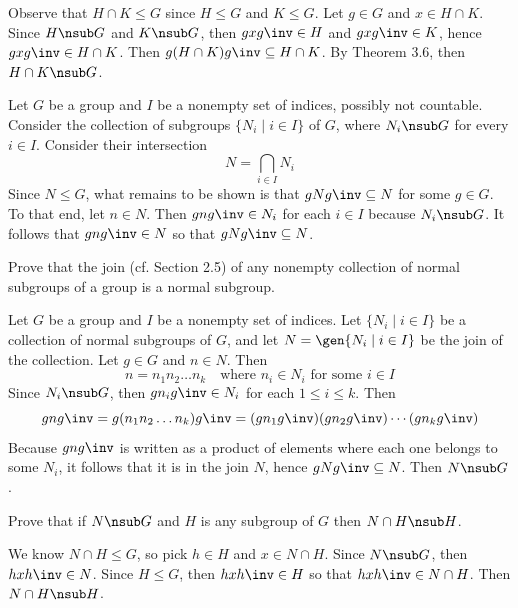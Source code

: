 \begin{solalph}
    \item Observe that $H \cap K \leq G$ since $H \leq G$ and $K \leq G$. Let $g \in G$ and $x \in H \cap K$. Since $H \nsub G$ and $K \nsub G$, then $gxg\inv \in H$ and $gxg\inv \in K$, hence $gxg\inv \in H \cap K$. Then $g(H \cap K)g\inv \subseteq H \cap K$. By Theorem 3.6, then $H \cap K \nsub G$.
    \item Let $G$ be a group and $I$ be a nonempty set of indices, possibly not countable. Consider the collection of subgroups $\{N_i \mid i \in I\}$ of $G$, where $N_i \nsub G$ for every $i \in I$. Consider their intersection
    \[N = \bigcap_{i \in I} N_i\]
    Since $N \leq G$, what remains to be shown is that $gNg\inv \subseteq N$ for some $g \in G$. To that end, let $n \in N$. Then $gng\inv \in N_i$ for each $i \in I$ because $N_i \nsub G$. It follows that $gng\inv \in N$ so that $gNg\inv \subseteq N$.
\end{solalph}

\begin{exercise}\label{ex3.1.23}
    Prove that the join (cf. Section 2.5) of any nonempty collection of normal subgroups of a group is a normal subgroup.
\end{exercise}

\begin{sol}
    Let $G$ be a group and $I$ be a nonempty set of indices. Let $\{N_i \mid i \in I\}$ be a collection of normal subgroups of $G$, and let $N = \gen{N_i \mid i \in I}$ be the join of the collection. Let $g \in G$ and $n \in N$. Then
    \[n = n_1n_2 \dots n_k \quad \text{where $n_i \in N_i$ for some $i \in I$}\]
    Since $N_i \nsub G$, then $gn_ig\inv \in N_i$ for each $1 \leq i \leq k$. Then
    \[gng\inv = g(n_1n_2 \ldots n_k)g\inv = (gn_1g\inv)(gn_2g\inv) \cdots (gn_kg\inv)\]
    Because $gng\inv$ is written as a product of elements where each one belongs to some $N_i$, it follows that it is in the join $N$, hence $gNg\inv \subseteq N$. Then $N \nsub G$.
\end{sol}

\begin{exercise}\label{ex3.1.24}
    Prove that if $N \nsub G$ and $H$ is any subgroup of $G$ then $N \cap H \nsub H$.
\end{exercise}

\begin{sol}
    We know $N \cap H \leq G$, so pick $h \in H$ and $x \in N \cap H$. Since $N \nsub G$, then $hxh\inv \in N$. Since $H \leq G$, then $hxh\inv \in H$ so that $hxh\inv \in N \cap H$. Then $N \cap H \nsub H$.
\end{sol}

